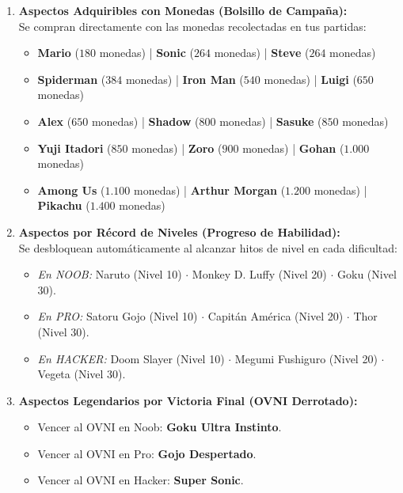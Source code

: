 \documentclass[11pt,a4paper]{article}
\begin{document}
\begin{enumerate}[label=\textbf{\Alph*.}, itemsep=0.8em]
    \item \textbf{Aspectos Adquiribles con Monedas (Bolsillo de Campaña):}\\
    Se compran directamente con las monedas recolectadas en tus partidas:
    \begin{itemize}[itemsep=0.3em]
        \item \textbf{Mario} ($180$ monedas) \textcolor{NavyLight!60}{|} \textbf{Sonic} ($264$ monedas) \textcolor{NavyLight!60}{|} \textbf{Steve} ($264$ monedas)
        \item \textbf{Spiderman} ($384$ monedas) \textcolor{NavyLight!60}{|} \textbf{Iron Man} ($540$ monedas) \textcolor{NavyLight!60}{|} \textbf{Luigi} ($650$ monedas)
        \item \textbf{Alex} ($650$ monedas) \textcolor{NavyLight!60}{|} \textbf{Shadow} ($800$ monedas) \textcolor{NavyLight!60}{|} \textbf{Sasuke} ($850$ monedas)
        \item \textbf{Yuji Itadori} ($850$ monedas) \textcolor{NavyLight!60}{|} \textbf{Zoro} ($900$ monedas) \textcolor{NavyLight!60}{|} \textbf{Gohan} ($1.000$ monedas)
        \item \textbf{Among Us} ($1.100$ monedas) \textcolor{NavyLight!60}{|} \textbf{Arthur Morgan} ($1.200$ monedas) \textcolor{NavyLight!60}{|} \textbf{Pikachu} ($1.400$ monedas)
    \end{itemize}

    \item \textbf{Aspectos por Récord de Niveles (Progreso de Habilidad):}\\
    Se desbloquean automáticamente al alcanzar hitos de nivel en cada dificultad:
    \begin{itemize}[itemsep=0.3em]
        \item \textit{En NOOB:} Naruto (Nivel 10) $\cdot$ Monkey D. Luffy (Nivel 20) $\cdot$ Goku (Nivel 30).
        \item \textit{En PRO:} Satoru Gojo (Nivel 10) $\cdot$ Capitán América (Nivel 20) $\cdot$ Thor (Nivel 30).
        \item \textit{En HACKER:} Doom Slayer (Nivel 10) $\cdot$ Megumi Fushiguro (Nivel 20) $\cdot$ Vegeta (Nivel 30).
    \end{itemize}

    \item \textbf{Aspectos Legendarios por Victoria Final (OVNI Derrotado):}
    \begin{itemize}[itemsep=0.3em]
        \item Vencer al OVNI en Noob: \textbf{Goku Ultra Instinto}.
        \item Vencer al OVNI en Pro: \textbf{Gojo Despertado}.
        \item Vencer al OVNI en Hacker: \textbf{Super Sonic}.
    \end{itemize}


\end{enumerate}
\end{document}
